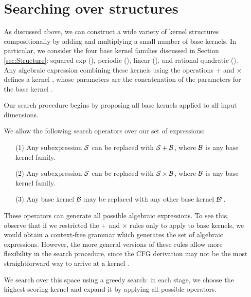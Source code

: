 \documentclass[twoside]{article}
\begin{document}
%

\section{Searching over structures}
\label{sec:Search}

As discussed above, we can construct a wide variety of kernel structures compositionally by adding and multiplying a small number of base kernels.
In particular, we consider the four base kernel families discussed in Section \ref{sec:Structure}: squared exp (\kSE), periodic (\kPer), linear (\kLin), and rational quadratic (\kRQ).
Any algebraic expression combining these kernels using the operations $+$ and $\times$ defines a kernel , whose parameters are the concatenation of the parameters for the base kernel . 

Our search procedure begins by proposing all base kernels applied to all input dimensions. 

We allow the following search operators over our set of expressions:
\begin{itemize}
\item[(1)] Any subexpression ${\cal S}$ can be replaced with ${\cal S} + {\cal B}$, where ${\cal B}$ is any base kernel family.
\item[(2)] Any subexpression ${\cal S}$ can be replaced with ${\cal S} \times {\cal B}$, where ${\cal B}$ is any base kernel family.
\item[(3)] Any base kernel ${\cal B}$ may be replaced with any other base kernel ${\cal B}^\prime$.
\end{itemize}

These operators can generate all possible algebraic expressions.
To see this, observe that if we restricted the $+$ and $\times$ rules only to apply to base kernels, we would obtain a context-free grammar which generates the set of algebraic expressions.
However, the more general versions of these rules allow more flexibility in the search procedure, since the CFG derivation may not be the most straightforward way to arrive at a kernel .

We search over this space using a greedy search: in each stage, we choose the highest scoring kernel and expand it by applying all possible operators.
\end{document}
